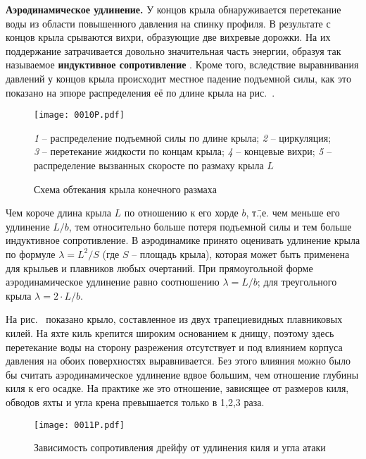 \textbf{Аэродинамическое удлинение.}
У концов крыла обнаруживается
перетекание воды из области повышенного давления на спинку профиля. В
результате с концов крыла срываются вихри, образующие две вихревые
дорожки. На их поддержание затрачивается довольно значительная часть
энергии, образуя так называемое \textbf{индуктивное сопротивление}
. Кроме того,
вследствие выравнивания давлений у концов крыла происходит местное
падение подъемной силы, как это показано на эпюре распределения её по
длине крыла на рис.~.

\begin{figure*}[htb]
  \centering
  \texttt{[image: 0010P.pdf]}
  \caption{Схема обтекания крыла конечного размаха}
  \label{fig:10}
  \centering
  \small
  \textit{1} \--- распределение подъемной силы по длине крыла;
  \textit{2} \--- циркуляция;
  \textit{3} \--- перетекание жидкости по концам крыла;
  \textit{4} \--- концевые вихри;
  \textit{5} \--- распределение вызванных скоросте по размаху крыла $L$
\end{figure*}

Чем короче длина крыла $L$ по отношению к его хорде $b$, т.\=,е. чем
меньше его удлинение $L/b$, тем относительно больше потеря подъемной
силы и тем больше индуктивное сопротивление. В аэродинамике принято
оценивать удлинение крыла по формуле $\lambda = L^2/S$ (где $S$ \---
площадь крыла), которая может быть применена для крыльев и плавников
любых очертаний. При прямоугольной форме аэродинамическое удлинение
равно соотношению $\lambda = L / b$; для треугольного крыла
$\lambda = 2 \cdot L / b$.

На рис.~ показано крыло, составленное из двух трапециевидных
плавниковых килей. На яхте киль крепится широким основанием к днищу,
поэтому здесь перетекание воды на сторону разрежения отсутствует и под
влиянием корпуса давления на обоих поверхностях выравнивается. Без
этого влияния можно было бы считать аэродинамическое удлинение вдвое
большим, чем отношение глубины киля к его осадке. На практике же это
отношение, зависящее от размеров киля, обводов яхты и угла крена
превышается только в 1,2,3 раза.

\begin{figure}[htb]
  \centering
  \texttt{[image: 0011P.pdf]}
  \caption{Зависимость сопротивления дрейфу от удлинения киля и угла атаки}
  \label{fig:11}
\end{figure}

